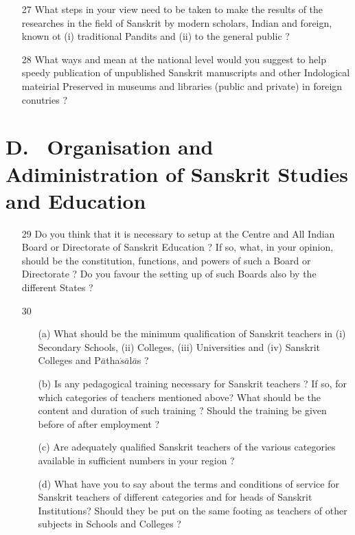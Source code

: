 {\rm 
\begin{itemize}
\item[27] What steps in your view need to be taken to make the results of the researches in the field of Sanskrit by modern scholars, Indian and foreign, known ot (i) traditional Pandits and (ii) to the general public ?

\item[28] What ways and mean at the national level would you suggest to help speedy publication of unpublished Sanskrit manuscripts and other Indological mateirial Preserved in museums and libraries (public and private) in foreign conutries ?
\end{itemize}
}

\section*{{\rm D.~ Organisation and Adiministration of Sanskrit Studies and Education}}

{\rm 
\begin{itemize}

\item[29] Do you think that it is necessary to setup at the Centre and All Indian Board or Directorate of Sanskrit Education ? If so, what, in your opinion, should be the constitution, functions, and powers of such a Board or Directorate ? Do you favour the setting up of such Boards also by the different States ?

\item[30] \begin{itemize}
           
           \item[(a)] What should be the minimum qualification of Sanskrit teachers in (i) Secondary Schools, (ii) Colleges, (iii) Universities and (iv) Sanskrit Colleges and P$\bar{a}$tha$\acute{s}\bar{a}$l$\bar{a}$s ?
           
           \item[(b)] Is any pedagogical training necessary for Sanskrit teachers ? If so, for which categories of teachers mentioned above? What should be the content and duration of such training ? Should the training be given before of after employment ?
           
           \item[(c)] Are adequately qualified Sanskrit teachers of the various categories available in sufficient numbers in your region ?
           
           \item[(d)] What have you to say about the terms and conditions of service for Sanskrit teachers of different categories and for heads of Sanskrit Institutions? Should they be put on the same footing as teachers of other subjects in Schools and Colleges ?
          \end{itemize}
\end{itemize}
}

